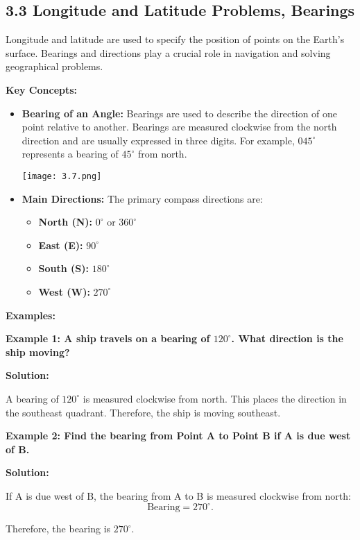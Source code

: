 
\subsection*{3.3 Longitude and Latitude Problems, Bearings}
Longitude and latitude are used to specify the position of points on the Earth's surface. Bearings and directions play a crucial role in navigation and solving geographical problems.

\textbf{Key Concepts:}
\begin{itemize}
	\item \textbf{Bearing of an Angle:} Bearings are used to describe the direction of one point relative to another. Bearings are measured clockwise from the north direction and are usually expressed in three digits. For example, $045^\circ$ represents a bearing of $45^\circ$ from north.
	\begin{center}
		\texttt{[image: 3.7.png]}
	\end{center}
	\item \textbf{Main Directions:} The primary compass directions are:
	\begin{itemize}
		\item \textbf{North (N):} $0^\circ$ or $360^\circ$
		\item \textbf{East (E):} $90^\circ$
		\item \textbf{South (S):} $180^\circ$
		\item \textbf{West (W):} $270^\circ$
	\end{itemize}
\end{itemize}

\textbf{Examples:}

\begin{flushleft}
	\textbf{Example 1: A ship travels on a bearing of $120^\circ$. What direction is the ship moving?}
	
	\vspace{0.5cm}
	\textbf{Solution:}
	\vspace{0.5cm}
	
	A bearing of $120^\circ$ is measured clockwise from north. This places the direction in the southeast quadrant. Therefore, the ship is moving southeast.
\end{flushleft}

\begin{flushleft}
	\textbf{Example 2: Find the bearing from Point A to Point B if A is due west of B.}
	
	\vspace{0.5cm}
	\textbf{Solution:}
	\vspace{0.5cm}
	
	If A is due west of B, the bearing from A to B is measured clockwise from north:
	\[
	\text{Bearing} = 270^\circ.
	\]
	
	Therefore, the bearing is $270^\circ$.
\end{flushleft}

